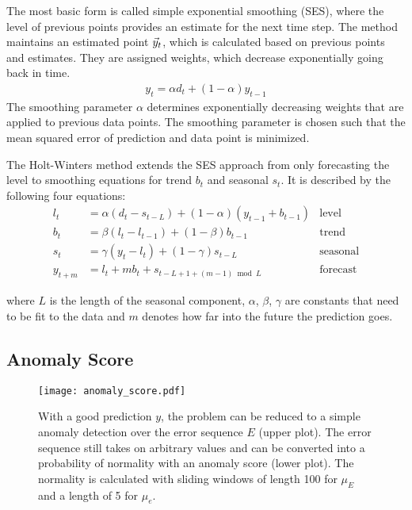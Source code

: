 The most basic form is called simple exponential smoothing (SES), where the
level of previous points provides an estimate for the next time step.  The
method maintains an estimated point $\vec{y}_t$, which is calculated based on
previous points and estimates.  They are assigned weights, which decrease
exponentially going back in time.
\begin{align}
  y_t = \alpha d_t + (1-\alpha)y_{t-1}
\end{align}
The smoothing parameter $\alpha$ determines exponentially
decreasing weights that are applied to previous data points.  The smoothing
parameter is chosen such that the mean squared error of prediction and data
point is minimized.

The Holt-Winters method extends the SES approach from only forecasting the level
to smoothing equations for trend $b_t$ and seasonal $s_t$.
It is described by the following four equations:
\begin{align}
  l_t &= \alpha(d_t - s_{t-L}) + (1-\alpha)(y_{t-1} + b_{t-1}) &\text{level} \\
  b_t &= \beta(l_t - l_{t-1}) + (1-\beta)b_{t-1} &\text{trend} \\
  s_t &= \gamma(y_t - l_t) + (1 - \gamma)s_{t-L} &\text{seasonal} \\
  y_{t+m} &= l_t + m b_t + s_{t-L+1+(m-1) \bmod L} &\text{forecast}
\end{align}

where $L$ is the length of the seasonal component, $\alpha$, $\beta$, $\gamma$
are constants that need to be fit to the data and $m$ denotes how far into
the future the prediction goes.


\subsection{Anomaly Score}%
\label{sub:anomaly_score}

\begin{figure}
  \centering
  \texttt{[image: anomaly\_score.pdf]}
  \caption{With a good prediction $y$, the problem can be reduced to a simple
    anomaly detection over the error sequence $E$ (upper plot). The error
    sequence still takes on arbitrary values and can be converted into a
    probability of normality with an anomaly score (lower plot).
    The normality is calculated with sliding windows of length 100 for $\mu_E$
    and a length of 5 for $\mu_e$.
  }
  \label{fig:anomaly_score}
\end{figure}


